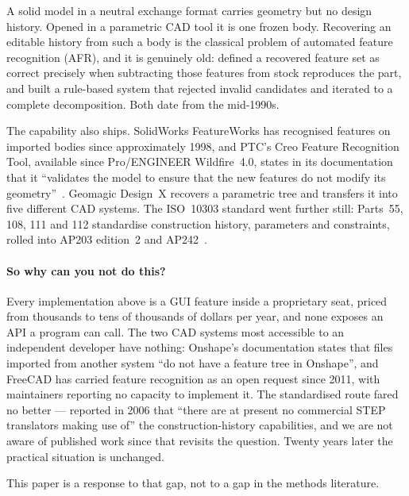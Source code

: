 \documentclass[11pt]{article}
\begin{document}
A solid model in a neutral exchange format carries geometry but no design
history. Opened in a parametric CAD tool it is one frozen body. Recovering an
editable history from such a body is the classical problem of automated feature
recognition (AFR), and it is genuinely old: \citet{TODO-gupta-nau} defined a
recovered feature set as correct precisely when subtracting those features from
stock reproduces the part, and \citet{TODO-vandenbrande} built a rule-based
system that rejected invalid candidates and iterated to a complete
decomposition. Both date from the mid-1990s.

The capability also ships. SolidWorks FeatureWorks has recognised features on
imported bodies since approximately 1998, and PTC's Creo Feature Recognition
Tool, available since Pro/ENGINEER Wildfire~4.0, states in its documentation
that it ``validates the model to ensure that the new features do not modify its
geometry''~\citep{TODO-creo-frt}. Geomagic Design~X recovers a parametric tree
and transfers it into five different CAD systems. The ISO~10303 standard went
further still: Parts~55, 108, 111 and 112 standardise construction history,
parameters and constraints, rolled into AP203 edition~2 and
AP242~\citep{TODO-pratt-kim}.

\paragraph{So why can you not do this?} Every implementation above is a GUI
feature inside a proprietary seat, priced from thousands to tens of thousands of
dollars per year, and none exposes an API a program can call. The two CAD
systems most accessible to an independent developer have nothing: Onshape's
documentation states that files imported from another system ``do not have a
feature tree in Onshape'', and FreeCAD has carried feature recognition as an
open request since 2011, with maintainers reporting no capacity to implement it.
The standardised route fared no better --- \citet{TODO-pratt-kim} reported in
2006 that ``there are at present no commercial STEP translators making use of''
the construction-history capabilities, and we are not aware of published work
since that revisits the question. Twenty years later the practical situation is
unchanged.

This paper is a response to that gap, not to a gap in the methods literature.
\end{document}
